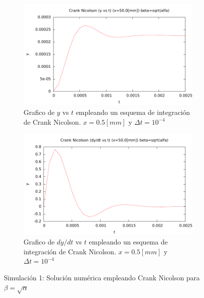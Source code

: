 

\begin{center}
\begin{figure} [H]
	\begin{subfigure}[b]{0.8\textwidth}
		\includegraphics{./parte3/graficos/grafico_cn_S1_y_b1.pdf}
		\caption{Grafico de $y$ vs $t$ empleando un esquema de integración de Crank Nicolson. $x=0.5[mm]$ y $\Delta t=10^{-4}$} 
		\label{fig:cnS1b1_y}
	\end{subfigure}
	
	\begin{subfigure}[b]{0.8\textwidth}
		\includegraphics{./parte3/graficos/grafico_cn_S1_dy_b1.pdf}
		\caption{Grafico de $dy/dt$ vs $t$ empleando un esquema de integración de Crank Nicolson. $x=0.5[mm]$ y $\Delta t=10^{-4}$} 
		\label{fig:cnS1b1_dy}
	\end{subfigure}
\caption{Simulación 1: Solución numérica empleando Crank Nicolson para $\beta=\sqrt{\alpha}$ } \label{cn_S1_b1}
\end{figure}
\end{center}

